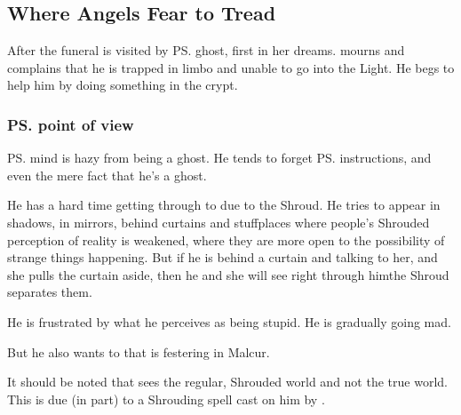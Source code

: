 \begin{garbage}
\subsection{Where Angels Fear to Tread}
After the funeral \Tiroco{} is visited by \ps{\Icor} ghost, first in her dreams. 
\Icor{} mourns and complains that he is trapped in limbo and unable to go into the Light. He begs \Tiroco{} to help him by doing something in the crypt.






\subsubsection{\ps{\Icor} point of view}
\ps{\Icor} mind is hazy from being a ghost. 
He tends to forget \ps{\Psyrex}{} instructions, and even the mere fact that he's a ghost.

He has a hard time getting through to \Tiroco{} due to the Shroud. 
He tries to appear in shadows, in mirrors, behind curtains and stuff\dash places where people's Shrouded perception of reality is weakened, where they are more open to the possibility of strange things happening. 
But if he is behind a curtain and talking to her, and she pulls the curtain aside, then he  and she will see right through him\dash the Shroud separates them. 

He is frustrated by what he perceives as \Tiroco{} being stupid. 
He is gradually going mad. 


But he also wants to  that is festering in Malcur. 

It should be noted that \Icor{} sees the regular, Shrouded world and not the true world. 
This is due (in part) to a Shrouding spell cast on him by \LocarPsyrex. 






\end{garbage}

